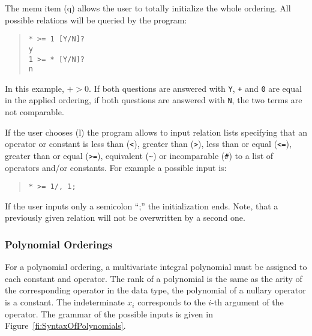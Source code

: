 The menu item (q) allows the user to totally initialize the whole ordering. 
All possible relations will be queried by the program:
\begin{quote}
\begin{verbatim}
* >= 1 [Y/N]?
y
1 >= * [Y/N]?
n
\end{verbatim}
\end{quote}

In this example, $+>0$. If both questions are answered with {\tt Y},
{\tt +} and {\tt 0} are equal in the applied ordering, if both questions are 
answered with {\tt N}, the two terms are not comparable.

If the user chooses (l) 
the program allows to input relation lists specifying that 
an operator or constant is less than (\verb+<+), greater than (\verb+>+), 
less than or equal (\verb+<=+), greater than or equal (\verb+>=+),
equivalent (\verb+~+) or incomparable (\verb+#+) to a list of
operators and/or constants.
For example a possible input is:
\begin{quote}
\begin{verbatim}
* >= 1/, 1;
\end{verbatim}
\end{quote}
If the user inputs only a semicolon ``;'' the initialization ends.
Note, that a previously given relation will not be overwritten by a second one. 

\subsubsection{Polynomial Orderings}
For a polynomial ordering, a multivariate integral polynomial
must be assigned to each constant and operator. The rank of a
polynomial is the same as the arity of the corresponding operator in the data
type, the polynomial of a nullary operator is a constant. The
indeterminate $x_i$ corresponds to the \(i\)-th argument of the operator.
The grammar of the possible inputs is given in
Figure~\ref{fi:SyntaxOfPolynomials}.

